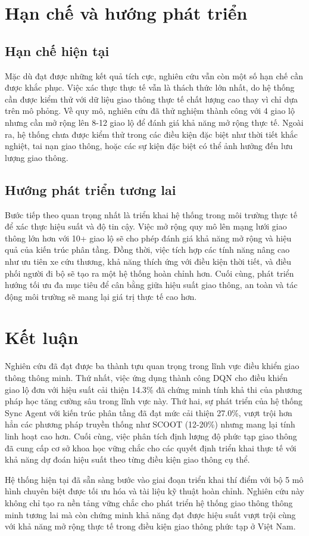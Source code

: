 \section{Hạn chế và hướng phát triển}

\subsection{Hạn chế hiện tại}
Mặc dù đạt được những kết quả tích cực, nghiên cứu vẫn còn một số hạn chế cần được khắc phục. Việc xác thực thực tế vẫn là thách thức lớn nhất, do hệ thống cần được kiểm thử với dữ liệu giao thông thực tế chất lượng cao thay vì chỉ dựa trên mô phỏng. Về quy mô, nghiên cứu đã thử nghiệm thành công với 4 giao lộ nhưng cần mở rộng lên 8-12 giao lộ để đánh giá khả năng mở rộng thực tế. Ngoài ra, hệ thống chưa được kiểm thử trong các điều kiện đặc biệt như thời tiết khắc nghiệt, tai nạn giao thông, hoặc các sự kiện đặc biệt có thể ảnh hưởng đến lưu lượng giao thông.

\subsection{Hướng phát triển tương lai}
Bước tiếp theo quan trọng nhất là triển khai hệ thống trong môi trường thực tế để xác thực hiệu suất và độ tin cậy. Việc mở rộng quy mô lên mạng lưới giao thông lớn hơn với 10+ giao lộ sẽ cho phép đánh giá khả năng mở rộng và hiệu quả của kiến trúc phân tầng. Đồng thời, việc tích hợp các tính năng nâng cao như ưu tiên xe cứu thương, khả năng thích ứng với điều kiện thời tiết, và điều phối người đi bộ sẽ tạo ra một hệ thống hoàn chỉnh hơn. Cuối cùng, phát triển hướng tối ưu đa mục tiêu để cân bằng giữa hiệu suất giao thông, an toàn và tác động môi trường sẽ mang lại giá trị thực tế cao hơn.

\section{Kết luận}

Nghiên cứu đã đạt được ba thành tựu quan trọng trong lĩnh vực điều khiển giao thông thông minh. Thứ nhất, việc ứng dụng thành công DQN cho điều khiển giao lộ đơn với hiệu suất cải thiện 14.3\% đã chứng minh tính khả thi của phương pháp học tăng cường sâu trong lĩnh vực này. Thứ hai, sự phát triển của hệ thống Sync Agent với kiến trúc phân tầng đã đạt mức cải thiện 27.0\%, vượt trội hơn hẳn các phương pháp truyền thống như SCOOT (12-20\%) nhưng mang lại tính linh hoạt cao hơn. Cuối cùng, việc phân tích định lượng độ phức tạp giao thông đã cung cấp cơ sở khoa học vững chắc cho các quyết định triển khai thực tế với khả năng dự đoán hiệu suất theo từng điều kiện giao thông cụ thể.

Hệ thống hiện tại đã sẵn sàng bước vào giai đoạn triển khai thí điểm với bộ 5 mô hình chuyên biệt được tối ưu hóa và tài liệu kỹ thuật hoàn chỉnh. Nghiên cứu này không chỉ tạo ra nền tảng vững chắc cho phát triển hệ thống giao thông thông minh tương lai mà còn chứng minh khả năng đạt được hiệu suất vượt trội cùng với khả năng mở rộng thực tế trong điều kiện giao thông phức tạp ở Việt Nam.